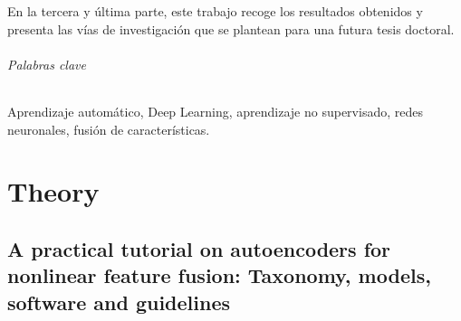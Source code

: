 \documentclass[oneside,openright,titlepage,numbers=noenddot,openany,headinclude,footinclude=true,
cleardoublepage=empty,abstractoff,BCOR=5mm,paper=a4,fontsize=12pt,main=spanish]{scrreprt}
\begin{document}
En la tercera y última parte, este trabajo recoge los resultados obtenidos y presenta las vías de investigación que se plantean para una futura tesis doctoral.

\paragraph{Palabras clave} Aprendizaje automático, Deep Learning, aprendizaje no supervisado, redes neuronales, fusión de características.

\part{Theory}
\label{p.theory}






\chapter{A practical tutorial on autoencoders for nonlinear feature fusion: Taxonomy, models, software and guidelines}



\end{document}
